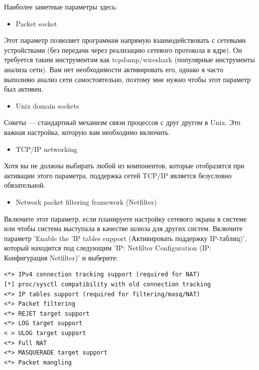 \documentclass[10pt]{book}
\begin{document}
Наиболее заметные параметры здесь:

\begin{itemize}
\item Packet socket               
\end{itemize}

Этот параметр позволяет программам напрямую взаимодействовать с сетевыми устройствами (без передачи через реализацию сетевого протокола в ядре). Он требуется таким инструментам как tcpdump/wireshark (популярные инструменты анализа сети). Вам нет необходимости активировать его, однако я часто выполняю анализ сети самостоятельно, поэтому мне нужно чтобы этот параметр был активен. 
\begin{itemize}
\item  Unix domain sockets                     
\end{itemize}

Сокеты — стандартный механизм связи процессов с друг другом в Unix. Это важная настройка, которую вам необходимо включить. 
\begin{itemize}
\item TCP/IP networking
\end{itemize}

Хотя вы не должны выбирать любой из компонентов, которые отобразятся при активации этого параметра, поддержка сетей TCP/IP является безусловно обязательной.

\begin{itemize}
\item  Network packet filtering framework (Netfilter)
\end{itemize}

Включите этот параметр, если планируете настройку сетевого экрана в системе или чтобы система выступала в качестве шлюза для других систем. Включите параметр 'Enable the 'IP tables support (Активировать поддержку IP-таблиц)', который находится под следующим 'IP: Netfilter Configuration (IP: Конфигурация Netfilter)' и выберите:

\vspace{3mm}
\begin{tcolorbox}[colback=gray!14!white, colframe=blue!75!blue]
\begin{lstlisting}
<*> IPv4 connection tracking support (required for NAT)
[*] proc/sysctl compatibility with old connection tracking
<*> IP tables support (required for filtering/masq/NAT)
<*> Packet filtering
<*> REJET target support
<*> LOG target support
< > ULOG target support
<*> Full NAT
<*> MASQUERADE target support
<*> Packet mangling
\end{lstlisting}
\end{tcolorbox}
\end{document}
